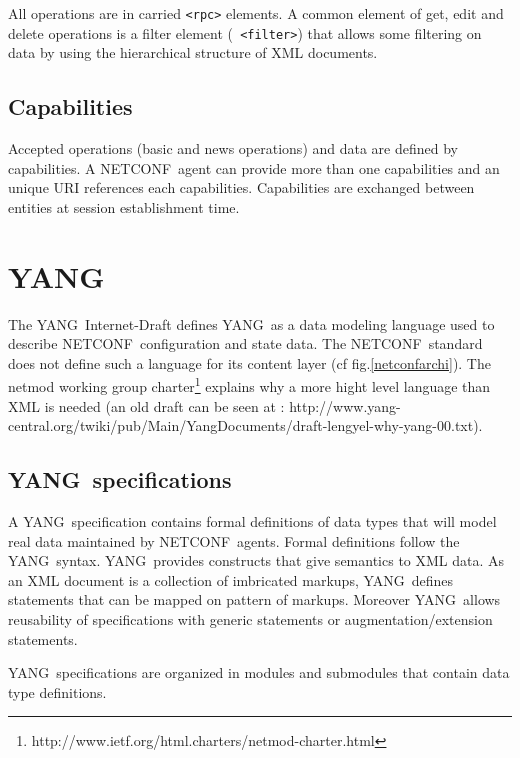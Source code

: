 \documentclass[a4paper]{article}
\newcommand{\nc}{NETCONF}
\newcommand{\y}{YANG}
\begin{document}
All operations are  in carried {\tt <rpc>} elements.  A common element
of  get,  edit  and  delete  operations  is  a  filter  element  ({\tt
<filter>})  that   allows  some  filtering   on  data  by   using  the
hierarchical structure of XML documents.

\subsection{Capabilities}
\label{capabilities}

Accepted operations  (basic and news operations) and  data are defined
by capabilities.  A \nc\ agent  can provide more than one capabilities
and  an unique  URI  references each  capabilities.  Capabilities  are
exchanged between entities at session establishment time.


\section{\y}
\label{yang}

The  \y\ Internet-Draft\cite{yang01}  defines \y\  as a  data modeling
language used to describe \nc\  configuration and state data. The \nc\
standard does  not define  such a language  for its content  layer (cf
fig.\ref{netconfarchi}).       The      netmod      working      group
charter\footnote{http://www.ietf.org/html.charters/netmod-charter.html}
explains why  a more hight level  language than XML is  needed (an old
draft           can          be           seen           at          :
http://www.yang-central.org/twiki/\-pub/\-Main/\-Yang\-Do\-cu\-ments/draft-lengyel-why-yang-00.txt).


\subsection{\y\ specifications}

A  \y\ specification contains  formal definitions  of data  types that
will model  real data maintained  by \nc\ agents.   Formal definitions
follow the \y\ syntax. \y\  provides constructs that give semantics to
XML data.  As an XML document  is a collection  of imbricated markups,
\y\   defines  statements   that   can  be   mapped   on  pattern   of
markups.  Moreover  \y\  allows  reusability  of  specifications  with
generic statements or augmentation/extension statements.

\y\ specifications are organized in modules and submodules
that contain data type definitions. 
\end{document}
